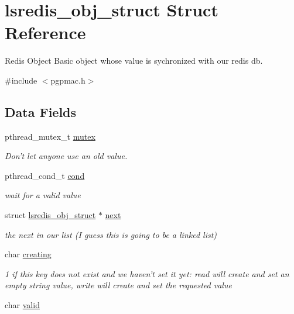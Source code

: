 \hypertarget{structlsredis__obj__struct}{\section{lsredis\-\_\-obj\-\_\-struct Struct Reference}
\label{structlsredis__obj__struct}
}


Redis Object Basic object whose value is sychronized with our redis db.  




{\ttfamily \#include $<$pgpmac.\-h$>$}

\subsection*{Data Fields}
\begin{DoxyCompactItemize}
\item 
pthread\-\_\-mutex\-\_\-t \hyperlink{structlsredis__obj__struct_a0da18e7d0f7d52459bbc6fbc696d5252}{mutex}
\begin{DoxyCompactList}\small\item\em Don't let anyone use an old value. \end{DoxyCompactList}\item 
pthread\-\_\-cond\-\_\-t \hyperlink{structlsredis__obj__struct_a356f6a228bb19ac7d66fdb1c875d68be}{cond}
\begin{DoxyCompactList}\small\item\em wait for a valid value \end{DoxyCompactList}\item 
struct \hyperlink{structlsredis__obj__struct}{lsredis\-\_\-obj\-\_\-struct} $\ast$ \hyperlink{structlsredis__obj__struct_afb7259e8c3c1c83ccc234b2b2894f2b0}{next}
\begin{DoxyCompactList}\small\item\em the next in our list (I guess this is going to be a linked list) \end{DoxyCompactList}\item 
char \hyperlink{structlsredis__obj__struct_ae0aa00ad745ee5bbc598c23ab794ed8a}{creating}
\begin{DoxyCompactList}\small\item\em 1 if this key does not exist and we haven't set it yet\-: read will create and set an empty string value, write will create and set the requested value \end{DoxyCompactList}\item 
char \hyperlink{structlsredis__obj__struct_a338ffa4123bd06b39c8b58f5e695575e}{valid}

\end{DoxyCompactItemize}
